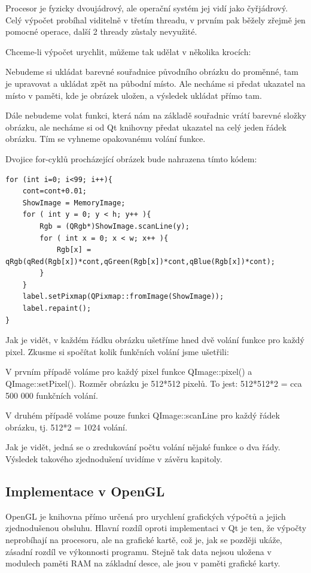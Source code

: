 Procesor je fyzicky dvoujádrový, ale operační systém jej vidí jako čyřjádrový. Celý výpočet probíhal viditelně v třetím threadu, v prvním pak běžely zřejmě jen pomocné operace, další 2 thready zůstaly nevyužité.

Chceme-li výpočet urychlit, můžeme tak udělat v několika krocích:

Nebudeme si ukládat barevné souřadnice původního obrázku do proměnné, tam je upravovat a ukládat zpět na půbodní místo. Ale necháme si předat ukazatel na místo v paměti, kde je obrázek uložen, a výsledek ukládat přímo tam.

Dále nebudeme volat funkci, která nám na základě souřadnic vrátí barevné složky obrázku, ale necháme si od Qt knihovny předat ukazatel na celý jeden řádek obrázku. Tím se vyhneme opakovanému volání funkce.

Dvojice for-cyklů procházející obrázek bude nahrazena tímto kódem:

\begin{lstlisting}[label=DicomImageClass,caption={...}]
for (int i=0; i<99; i++){
	cont=cont+0.01;
	ShowImage = MemoryImage;
	for ( int y = 0; y < h; y++ ){
		Rgb = (QRgb*)ShowImage.scanLine(y);
		for ( int x = 0; x < w; x++ ){
			Rgb[x] = qRgb(qRed(Rgb[x])*cont,qGreen(Rgb[x])*cont,qBlue(Rgb[x])*cont);
		}
	}
	label.setPixmap(QPixmap::fromImage(ShowImage));
	label.repaint();
}
\end{lstlisting}

Jak je vidět, v každém řádku obrázku ušetříme hned dvě volání funkce pro každý pixel. Zkusme si spočítat kolik funkčních volání jsme ušetřili:

V prvním případě voláme pro každý pixel funkce QImage::pixel() a QImage::setPixel(). Rozměr obrázku je 512*512 pixelů. To jest: 512*512*2 = cca 500 000 funkčních volání.

V druhém případě voláme pouze funkci QImage::scanLine pro každý řádek obrázku, tj. 512*2 = 1024 volání.

Jak je vidět, jedná se o zredukování počtu volání nějaké funkce o dva řády. Výsledek takového zjednodušení uvidíme v závěru kapitoly.


\subsection{Implementace v OpenGL}

OpenGL je knihovna přímo určená pro urychlení grafických výpočtů a jejich zjednodušenou obsluhu. Hlavní rozdíl oproti implementaci v Qt je ten, že výpočty neprobíhají na procesoru, ale na grafické kartě, což je, jak se později ukáže, zásadní rozdíl ve výkonnosti programu. Stejně tak data nejsou uložena v modulech paměti RAM na základní desce, ale jsou v paměti grafické karty.

